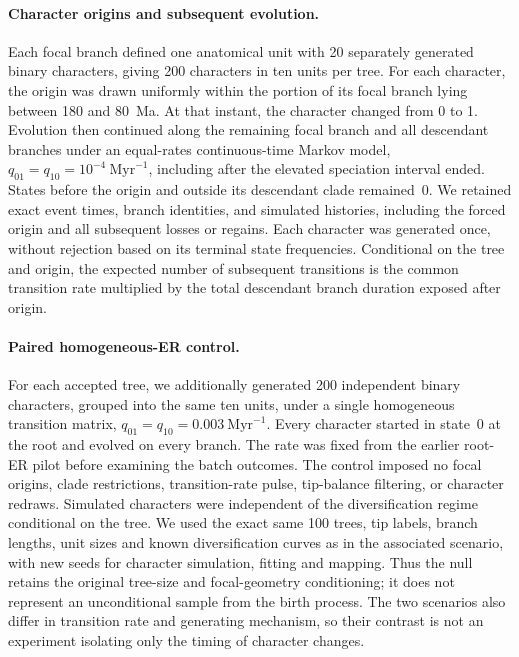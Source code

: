\paragraph{Character origins and subsequent evolution.}
Each focal branch defined one anatomical unit with 20 separately generated
binary characters, giving 200 characters in ten units per tree. For each
character, the origin was drawn uniformly within the portion of its focal
branch lying between 180 and 80~Ma. At that instant, the character changed
from 0 to 1. Evolution then continued along the remaining focal branch and
all descendant branches under an equal-rates continuous-time Markov model,
$q_{01}=q_{10}=10^{-4}~\mathrm{Myr}^{-1}$, including after the elevated
speciation interval ended. States before the origin and outside its
descendant clade remained~0. We retained exact event times, branch identities,
and simulated histories, including the forced origin and all subsequent
losses or regains. Each character was generated once, without rejection
based on its terminal state frequencies. Conditional on the tree and origin,
the expected number of subsequent transitions is the common transition rate
multiplied by the total descendant branch duration exposed after origin.

\paragraph{Paired homogeneous-ER control.}
For each accepted tree, we additionally generated 200 independent binary
characters, grouped into the same ten units, under a single homogeneous
transition matrix, $q_{01}=q_{10}=0.003~\mathrm{Myr}^{-1}$. Every character
started in state~0 at the root and evolved on every branch. The rate was
fixed from the earlier root-ER pilot before examining the batch outcomes.
The control imposed no focal origins, clade restrictions, transition-rate
pulse, tip-balance filtering, or character redraws. Simulated characters were
independent of the diversification regime conditional on the tree. We used
the exact same 100 trees, tip labels, branch lengths, unit sizes and
known diversification curves as in the associated scenario, with new seeds
for character simulation, fitting and mapping. Thus the null retains the
original tree-size and focal-geometry conditioning; it does not represent an
unconditional sample from the birth process. The two scenarios also differ
in transition rate and generating mechanism, so their contrast is not an
experiment isolating only the timing of character changes.

